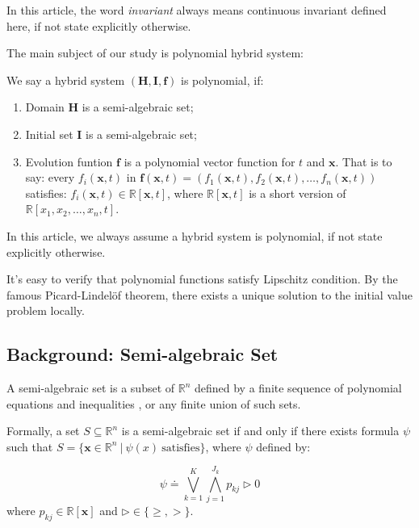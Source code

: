 \documentclass{article}
\begin{document}
In this article, the word \emph{invariant} always means continuous invariant defined here, if not state explicitly otherwise.

The main subject of our study is polynomial hybrid system: 
\begin{Definition}
	We say a hybrid system $(\boldsymbol{H}, \boldsymbol{I}, \boldsymbol{f})$ is polynomial, if: 
	\begin{enumerate}
		\item Domain $\boldsymbol{H}$ is a semi-algebraic set;
		\item Initial set $\boldsymbol{I}$ is a semi-algebraic set;
		\item Evolution funtion $\boldsymbol{f}$ is a polynomial vector function for $t$ and $\boldsymbol{x}$. That is to say: every $f_i(\boldsymbol{x}, t)$ in $\boldsymbol{f}(\boldsymbol{x}, t) = (f_1(\boldsymbol{x}, t), f_2(\boldsymbol{x}, t), \dots, f_n(\boldsymbol{x}, t))$ satisfies: $f_i(\boldsymbol{x}, t) \in \mathbb{R}[\boldsymbol{x}, t]$, where $\mathbb{R}[\boldsymbol{x}, t]$ is a short version of $\mathbb{R}[x_1, x_2, \dots, x_n, t]$.
	\end{enumerate}
\end{Definition}

In this article, we always assume a hybrid system is polynomial, if not state explicitly otherwise.

It's easy to verify that polynomial functions satisfy Lipschitz condition. By the famous Picard-Lindel\"{o}f theorem, there exists a unique solution to the initial value problem locally.

\subsection{Background: Semi-algebraic Set} 
\begin{Definition}
\label{def:semialgebra}
A semi-algebraic set is a subset of $\mathbb{R}^n$ defined by a finite sequence of polynomial equations and inequalities , or any finite union of such sets.

Formally, a set $S \subseteq \mathbb{R}^n$ is a semi-algebraic set if and only if there exists formula $\psi$ such that $S = \{\boldsymbol{x} \in \mathbb{R}^n\ |\ \psi(x)\ \text{satisfies} \}$,  where $\psi$ defined by: 

\begin{displaymath}
	\psi \doteq \bigvee_{k=1}^{K} \bigwedge_{j=1}^{J_k}p_{kj} \rhd 0
\end{displaymath}
where $p_{kj} \in \mathbb{R}[\boldsymbol{x}]$ and $\rhd \in \{\geq, >\}$.
\end{Definition}
\end{document}
